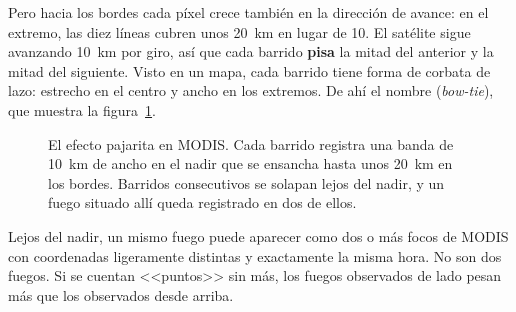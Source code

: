 Pero hacia los bordes cada píxel crece también en la dirección de avance: en el extremo, las
diez líneas cubren unos 20~km en lugar de 10. El satélite sigue avanzando 10~km por giro, así
que cada barrido \textbf{pisa} la mitad del anterior y la mitad del siguiente. Visto en un mapa,
cada barrido tiene forma de corbata de lazo: estrecho en el centro y ancho en los extremos. De
ahí el nombre  (\emph{bow-tie}), que muestra la
figura~\ref{fig:bowtie}.

\begin{figure}[ht]
\centering
{}
\caption{El efecto pajarita en MODIS. Cada barrido registra una banda de 10~km de ancho en el
nadir que se ensancha hasta unos 20~km en los bordes. Barridos consecutivos se solapan lejos del
nadir, y un fuego situado allí queda registrado en dos de ellos.}
\label{fig:bowtie}
\end{figure}

\begin{atencion}
Lejos del nadir, un mismo fuego puede aparecer como dos o más focos de MODIS con coordenadas
ligeramente distintas y exactamente la misma hora. No son dos fuegos. Si se cuentan <<puntos>>
sin más, los fuegos observados de lado pesan más que los observados desde arriba.
\end{atencion}

